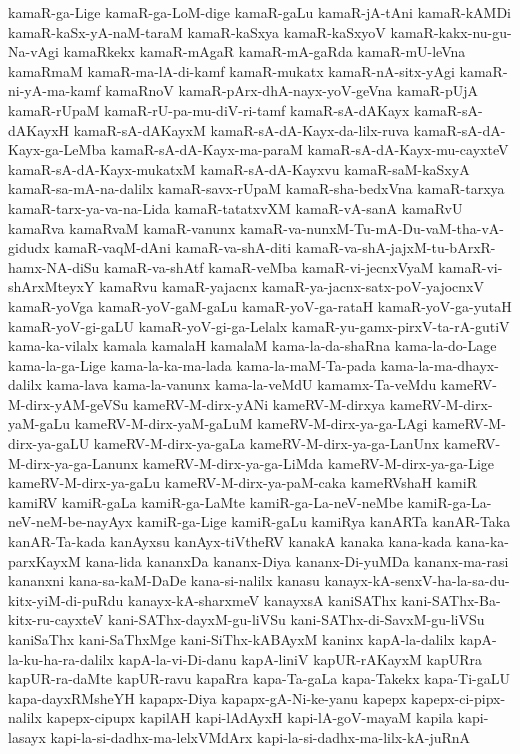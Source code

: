 {kamaR-ga-Lige
kamaR-ga-LoM-dige
kamaR-gaLu
kamaR-jA-tAni
kamaR-kAMDi
kamaR-kaSx-yA-naM-taraM
kamaR-kaSxya
kamaR-kaSxyoV
kamaR-kakx-nu-gu-Na-vAgi
kamaRkekx
kamaR-mAgaR
kamaR-mA-gaRda
kamaR-mU-leVna
kamaRmaM
kamaR-ma-lA-di-kamf
kamaR-mukatx
kamaR-nA-sitx-yAgi
kamaR-ni-yA-ma-kamf
kamaRnoV
kamaR-pArx-dhA-nayx-yoV-geVna
kamaR-pUjA
kamaR-rUpaM
kamaR-rU-pa-mu-diV-ri-tamf
kamaR-sA-dAKayx
kamaR-sA-dAKayxH
kamaR-sA-dAKayxM
kamaR-sA-dA-Kayx-da-lilx-ruva
kamaR-sA-dA-Kayx-ga-LeMba
kamaR-sA-dA-Kayx-ma-paraM
kamaR-sA-dA-Kayx-mu-cayxteV
kamaR-sA-dA-Kayx-mukatxM
kamaR-sA-dA-Kayxvu
kamaR-saM-kaSxyA
kamaR-sa-mA-na-dalilx
kamaR-savx-rUpaM
kamaR-sha-bedxVna
kamaR-tarxya
kamaR-tarx-ya-va-na-Lida
kamaR-tatatxvXM
kamaR-vA-sanA
kamaRvU
kamaRva
kamaRvaM
kamaR-vanunx
kamaR-va-nunxM-Tu-mA-Du-vaM-tha-vA-gidudx
kamaR-vaqM-dAni
kamaR-va-shA-diti
kamaR-va-shA-jajxM-tu-bArxR-hamx-NA-diSu
kamaR-va-shAtf
kamaR-veMba
kamaR-vi-jecnxVyaM
kamaR-vi-shArxMteyxY
kamaRvu
kamaR-yajacnx
kamaR-ya-jacnx-satx-poV-yajocnxV
kamaR-yoVga
kamaR-yoV-gaM-gaLu
kamaR-yoV-ga-rataH
kamaR-yoV-ga-yutaH
kamaR-yoV-gi-gaLU
kamaR-yoV-gi-ga-Lelalx
kamaR-yu-gamx-pirxV-ta-rA-gutiV
kama-ka-vilalx
kamala
kamalaH
kamalaM
kama-la-da-shaRna
kama-la-do-Lage
kama-la-ga-Lige
kama-la-ka-ma-lada
kama-la-maM-Ta-pada
kama-la-ma-dhayx-dalilx
kama-lava
kama-la-vanunx
kama-la-veMdU
kamamx-Ta-veMdu
kameRV-M-dirx-yAM-geVSu
kameRV-M-dirx-yANi
kameRV-M-dirxya
kameRV-M-dirx-yaM-gaLu
kameRV-M-dirx-yaM-gaLuM
kameRV-M-dirx-ya-ga-LAgi
kameRV-M-dirx-ya-gaLU
kameRV-M-dirx-ya-gaLa
kameRV-M-dirx-ya-ga-LanUnx
kameRV-M-dirx-ya-ga-Lanunx
kameRV-M-dirx-ya-ga-LiMda
kameRV-M-dirx-ya-ga-Lige
kameRV-M-dirx-ya-gaLu
kameRV-M-dirx-ya-paM-caka
kameRVshaH
kamiR
kamiRV
kamiR-gaLa
kamiR-ga-LaMte
kamiR-ga-La-neV-neMbe
kamiR-ga-La-neV-neM-be-nayAyx
kamiR-ga-Lige
kamiR-gaLu
kamiRya
kanARTa
kanAR-Taka
kanAR-Ta-kada
kanAyxsu
kanAyx-tiVtheRV
kanakA
kanaka
kana-kada
kana-ka-parxKayxM
kana-lida
kananxDa
kananx-Diya
kananx-Di-yuMDa
kananx-ma-rasi
kananxni
kana-sa-kaM-DaDe
kana-si-nalilx
kanasu
kanayx-kA-senxV-ha-la-sa-du-kitx-yiM-di-puRdu
kanayx-kA-sharxmeV
kanayxsA
kaniSAThx
kani-SAThx-Ba-kitx-ru-cayxteV
kani-SAThx-dayxM-gu-liVSu
kani-SAThx-di-SavxM-gu-liVSu
kaniSaThx
kani-SaThxMge
kani-SiThx-kABAyxM
kaninx
kapA-la-dalilx
kapA-la-ku-ha-ra-dalilx
kapA-la-vi-Di-danu
kapA-liniV
kapUR-rAKayxM
kapURra
kapUR-ra-daMte
kapUR-ravu
kapaRra
kapa-Ta-gaLa
kapa-Takekx
kapa-Ti-gaLU
kapa-dayxRMsheYH
kapapx-Diya
kapapx-gA-Ni-ke-yanu
kapepx
kapepx-ci-pipx-nalilx
kapepx-cipupx
kapilAH
kapi-lAdAyxH
kapi-lA-goV-mayaM
kapila
kapi-lasayx
kapi-la-si-dadhx-ma-lelxVMdArx
kapi-la-si-dadhx-ma-lilx-kA-juRnA
}
